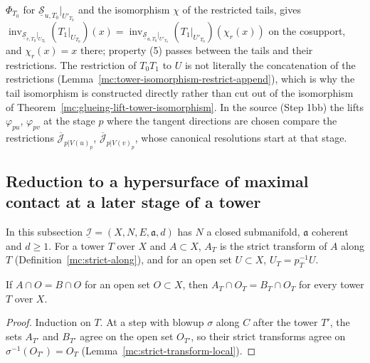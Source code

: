 \(\Phi_{T_0}\) for \(\underline{\mathcal S}_{u,T_0}|_{U'_{T_0}}\) and the isomorphism \(\chi\) of the restricted tails, gives
\(\operatorname{inv}_{\underline{\mathcal S}_{v,T_0}|_{U_{T_0}}}(T_1|_{U_{T_0}})(x)=\operatorname{inv}_{\underline{\mathcal S}_{u,T_0}|_{U'_{T_0}}}(T_1|_{U'_{T_0}})(\chi_r(x))\) on the cosupport, and
\(\chi_r(x)=x\) there; property (5) passes between the tails and their restrictions. The restriction of \(T_0T_1\) to \(U\) is not literally the concatenation of the restrictions
(Lemma~\ref{mc:tower-isomorphism-restrict-append}), which is why the tail isomorphism is constructed directly rather than cut out of the isomorphism of
Theorem~\ref{mc:glueing-lift-tower-isomorphism}. In the source (Step 1bb) the lifts \(\varphi_{pu}\), \(\varphi_{pv}\) at the stage \(p\) where the tangent directions are chosen
compare the restrictions \(\overline{\mathcal J}_{p|V(u)_p}\), \(\overline{\mathcal J}_{p|V(v)_p}\), whose canonical resolutions start at that stage.

\subsection{Reduction to a hypersurface of maximal contact at a later stage of a tower}

In this subsection \(\underline{\mathcal I}=(X,N,E,\mathfrak a,d)\) has \(N\) a closed submanifold, \(\mathfrak a\) coherent and \(d\ge1\). For a tower \(T\) over \(X\) and
\(A\subset X\), \(A_T\) is the strict transform of \(A\) along \(T\) (Definition~\ref{mc:strict-along}), and for an open set \(U\subset X\), \(U_T=p_T^{-1}U\).

\begin{lemma}
\label{mc:strict-along-local}
\leanok
If \(A\cap O=B\cap O\) for an open set \(O\subset X\), then \(A_T\cap O_T=B_T\cap O_T\) for every tower \(T\) over \(X\).
\end{lemma}
\begin{proof}
\leanok
Induction on \(T\). At a step with blowup \(\sigma\) along \(C\) after the tower \(T'\), the sets \(A_{T'}\) and \(B_{T'}\) agree on the open set \(O_{T'}\), so their strict
transforms agree on \(\sigma^{-1}(O_{T'})=O_T\) (Lemma~\ref{mc:strict-transform-local}).
\end{proof}

